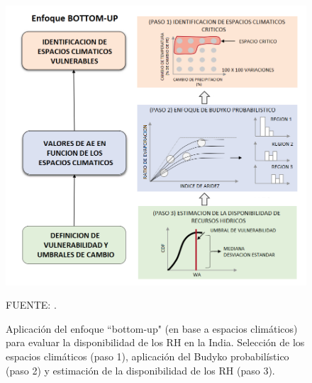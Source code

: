 \begin{figure}[ht!]
	\includegraphics[scale=0.63]{Images/Singh2015.png}
	\centering
	\caption{Aplicación del enfoque “bottom-up" (en base a espacios climáticos) para evaluar la disponibilidad de los RH en la India. Selección de los espacios climáticos (paso 1), aplicación del Budyko probabilístico (paso 2) y estimación de la disponibilidad de los RH (paso 3).}
	{\raggedright FUENTE: \citet{Singh2015}. \par}

	\label{fig:Singh2015}
\end{figure}